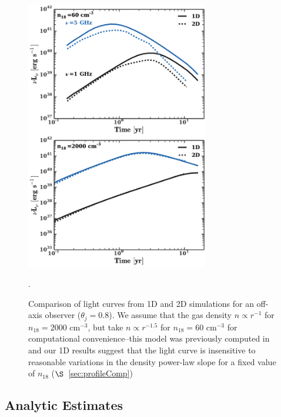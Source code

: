 \documentclass[usenatbib,fleqn]{mnras}
\begin{document}
\begin{figure}
\includegraphics[width=8cm]{1d_2d.pdf}
\caption{\label{fig:1D2DB} Comparison of light curves from 1D and 2D
  simulations for an off-axis observer ($\theta_{j} = 0.8$). We
  assume that the gas density $n\propto r^{-1}$ for $n_{18}=2000$
  cm$^{-3}$, but take $n\propto r^{-1.5}$ for $n_{18}=60$ cm$^{-3}$
  for computational convenience--this model was previously computed in
  \citet{Mimica+2015} and our 1D results suggest that the light curve
  is insensitive to reasonable variations in the density power-law
  slope for a fixed value of $n_{18}$ ($\S$~\ref{sec:profileComp})}.
\end{figure}


\subsection{Analytic Estimates}
\label{sec:analyt}
\end{document}
